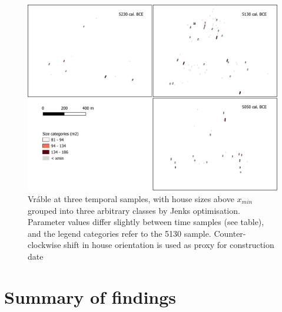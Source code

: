 \documentclass[
  12pt,
]{book}
\begin{document}
\begin{figure}
\hypertarget{fig:06-vrable-time-map}{%
\centering
\includegraphics{Results/fig06_vrable_time.pdf}
\caption{Vráble at three temporal samples, with house sizes above \(x_{min}\) grouped into three arbitrary classes by Jenks optimisation. Parameter values differ slightly between time samples (see table), and the legend categories refer to the 5130 sample. Counter-clockwise shift in house orientation is used as proxy for construction date}\label{fig:06-vrable-time-map}
}
\end{figure}

\FloatBarrier

\hypertarget{summary-of-findings}{%
\section{Summary of findings}\label{summary-of-findings}}
\end{document}
